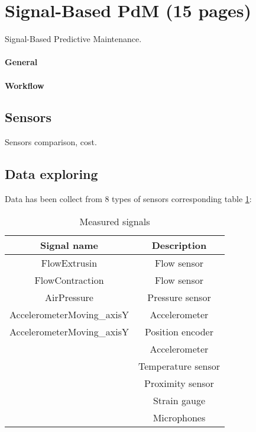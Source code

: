 \documentclass[class=article, crop=false]{standalone}
\begin{document}
\tableofcontents



\section{Signal-Based PdM (15 pages)}
Signal-Based Predictive Maintenance.
\paragraph{General}
\paragraph{Workflow}


\subsection{Sensors}
Sensors comparison, cost.

\subsection{Data exploring}
Data has been collect from 8 types of sensors corresponding table
\ref{tab:measured_signals}:
\begin{table}[h]
    \centering
    \begin{tabular}{|c|c|}
        \hline
        Signal name                   &   Description       \\     
               \hline
           FlowExtrusin               &   Flow sensor       \\
           FlowContraction            &   Flow sensor       \\
           AirPressure                &   Pressure sensor   \\
           AccelerometerMoving\_axisY &   Accelerometer     \\
           AccelerometerMoving\_axisY &   Position encoder  \\
                                      &   Accelerometer     \\
                                      &   Temperature sensor\\
                                      &   Proximity sensor  \\
                                      &   Strain gauge      \\ 
                                      &   Microphones       \\ 
        \hline
    \end{tabular}
    \caption{Measured signals}
    \label{tab:measured_signals}
\end{table}
\end{document}
